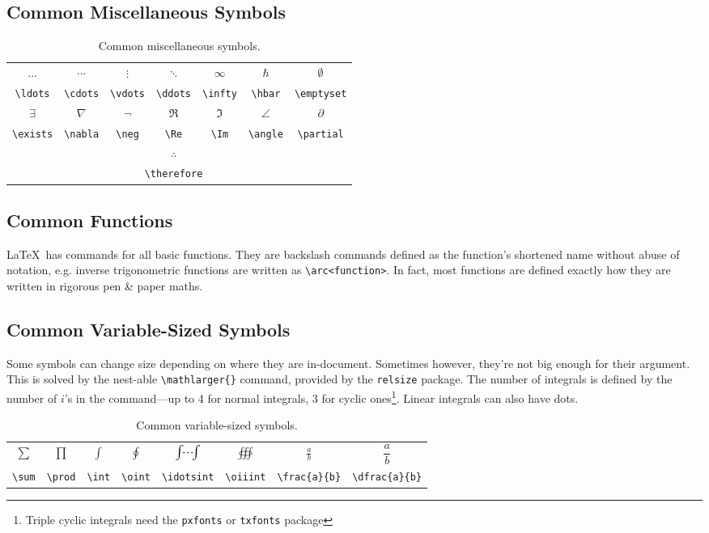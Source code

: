 \subsection{Common Miscellaneous Symbols}
%
\begin{table}[!htbp]
    \centering
    \caption{Common miscellaneous symbols.}
    \label{t:miscfym}
    \begin{tabular}{ccccccc}
        $\ldots$ & $\cdots$ & $\vdots$ & $\ddots$ & $\infty$ & $\hbar$ & $\emptyset$\\
        \verb|\ldots| & \verb|\cdots| & \verb|\vdots| & \verb|\ddots| & \verb|\infty| & \verb|\hbar| & \verb|\emptyset|\\
        $\exists$ & $\nabla$ & $\neg$ & $\Re$ & $\Im$ & $\angle$ & $\partial$\\
        \verb|\exists| & \verb|\nabla| & \verb|\neg| & \verb|\Re| & \verb|\Im| & \verb|\angle| & \verb|\partial|\\
        & \multicolumn{5}{c}{$\therefore$} & \\
        & \multicolumn{5}{c}{\texttt{\textbackslash therefore}} & \\
    \end{tabular}
\end{table}
%
\subsection{Common Functions}
%
\LaTeX~has commands for all basic functions.  They are backslash
commands defined as the function's shortened name without abuse of
notation, e.g. inverse trigonometric functions are written as
\verb|\arc<function>|.  In fact, most functions are defined exactly
how they are written in rigorous pen \& paper maths.
%
\subsection{Common Variable-Sized Symbols}
%
Some symbols can change size depending on where they are in-document.
Sometimes however, they're not big enough for their argument.  This is
solved by the nest-able \verb|\mathlarger{}| command, provided by the
\verb|relsize| package.  The number of integrals is defined by the
number of $i$'s in the command---up to 4 for normal integrals, 3 for
cyclic ones\footnote{Triple cyclic integrals need the \texttt{pxfonts}
  or \texttt{txfonts} package}.  Linear integrals can also have dots.
\begin{table}[!htbp]
    \centering
    \caption{Common variable-sized symbols.}
    \label{t:vss}
    \begin{tabular}{cccccccc}
        $\sum$ & $\prod$ & $\int$ & $\oint$ & $\idotsint$ & $\oiiint$ & $\frac{a}{b}$ & $\dfrac{a}{b}$ \\
        \verb|\sum| & \verb|\prod| & \verb|\int| & \verb|\oint| & \verb|\idotsint| & \verb|\oiiint| & \verb|\frac{a}{b}| & \verb|\dfrac{a}{b}| \\
    \end{tabular}
\end{table}
%
